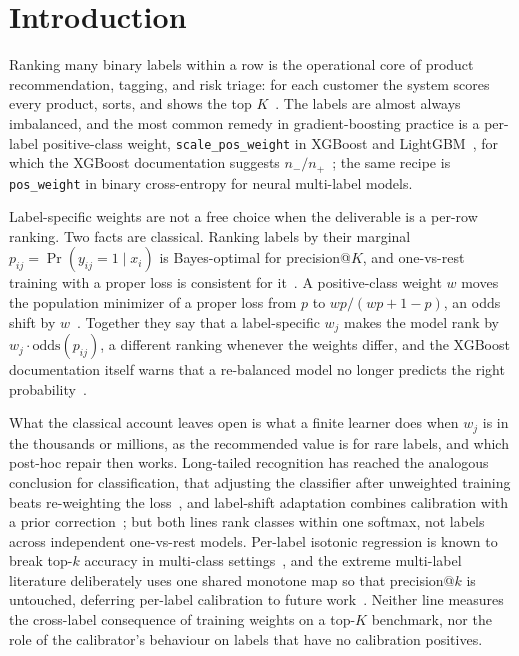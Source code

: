 \documentclass[sigconf,nonacm]{acmart}
\begin{document}
\maketitle

\section{Introduction}
\label{sec:intro}

Ranking many binary labels within a row is the operational core of product recommendation, tagging, and risk triage: for each customer the system scores every product, sorts, and shows the top $K$~\cite{Jain2016XMLLoss,Menon2019Reductions}. The labels are almost always imbalanced, and the most common remedy in gradient-boosting practice is a per-label positive-class weight, \texttt{scale\_pos\_weight} in XGBoost and LightGBM~\cite{Chen2016XGBoost,Ke2017LightGBM}, for which the XGBoost documentation suggests $n_-/n_+$~\cite{XGBoostDocs}; the same recipe is \texttt{pos\_weight} in binary cross-entropy for neural multi-label models.

Label-specific weights are not a free choice when the deliverable is a per-row ranking. Two facts are classical. Ranking labels by their marginal $p_{ij}=\Pr(y_{ij}=1\mid x_i)$ is Bayes-optimal for precision@$K$, and one-vs-rest training with a proper loss is consistent for it~\cite{Dembczynski2012Univariate,Menon2019Reductions,Wydmuch2018PLT}. A positive-class weight $w$ moves the population minimizer of a proper loss from $p$ to $wp/(wp+1-p)$, an odds shift by $w$~\cite{Elkan2001,Saerens2002}. Together they say that a label-specific $w_j$ makes the model rank by $w_j\cdot\mathrm{odds}(p_{ij})$, a different ranking whenever the weights differ, and the XGBoost documentation itself warns that a re-balanced model no longer predicts the right probability~\cite{XGBoostDocs}.

What the classical account leaves open is what a finite learner does when $w_j$ is in the thousands or millions, as the recommended value is for rare labels, and which post-hoc repair then works. Long-tailed recognition has reached the analogous conclusion for classification, that adjusting the classifier after unweighted training beats re-weighting the loss~\cite{Kang2020Decoupling,Menon2021LogitAdjust}, and label-shift adaptation combines calibration with a prior correction~\cite{Lipton2018LabelShift,Alexandari2020MLLS}; but both lines rank classes within one softmax, not labels across independent one-vs-rest models. Per-label isotonic regression is known to break top-$k$ accuracy in multi-class settings~\cite{Patel2021IMax}, and the extreme multi-label literature deliberately uses one shared monotone map so that precision@$k$ is untouched, deferring per-label calibration to future work~\cite{Ullah2025XMLCCalib}. Neither line measures the cross-label consequence of training weights on a top-$K$ benchmark, nor the role of the calibrator's behaviour on labels that have no calibration positives.
\end{document}

